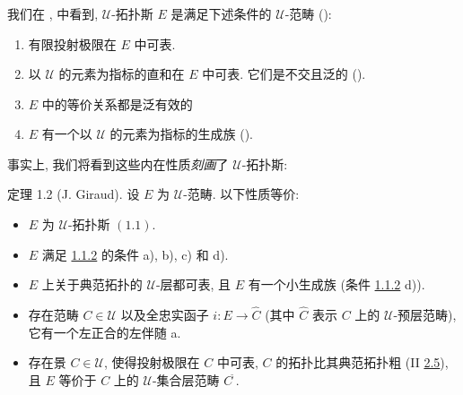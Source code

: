 \subsubsection{}
我们在 ,  中看到, $𝒰$-拓扑斯 $E$ 是满足下述条件的 $𝒰$-范畴 ():
\begin{enumerate}
\renewcommand{\theenumi}{\alph{enumi}}
\renewcommand{\labelenumi}{\theenumi)}
\item 有限投射极限在 $E$ 中可表.

\item 以 $𝒰$ 的元素为指标的直和在 $E$ 中可表. 它们是不交且泛的 ().

\item $E$ 中的等价关系都是泛有效的 

\item $E$ 有一个以 $𝒰$ 的元素为指标的生成族 ().
\end{enumerate}

事实上\pageoriginale, 我们将看到这些内在性质\emph{刻画}了 $𝒰$-拓扑斯:



\begin{enonce*}{定理 1.2}
{\rm (J. Giraud).} 设 $E$ 为 $𝒰$-范畴. 以下性质等价:
\begin{itemize}
\item[i)] $E$ 为 $𝒰$-拓扑斯 $(\hyperref[IV.def1.1]{1.1})$.

\item[ii)] $E$ 满足 {\rm \hyperref[IV.subsubsec1.1.2]{1.1.2} 的条件 a), b), c) 和 d).}

\item[iii)] $E$ 上关于典范拓扑的 $𝒰$-层都可表, 且 $E$ 有一个小生成族 (条件 {\rm \hyperref[IV.subsubsec1.1.2]{1.1.2} d)}).

\item[iv)] 存在范畴 $C\in 𝒰$ 以及全忠实函子 $i:E\rightarrow \widehat{C}$ (其中 $\widehat{C}$ 表示 $C$ 上的 $𝒰$-预层范畴), 它有一个左正合的左伴随 a.

\item[${\rm i')}$] 存在景 $C\in 𝒰$, 使得投射极限在 $C$ 中可表, $C$ 的拓扑比其典范拓扑粗 {\rm (II \hyperref[II.def2.5]{2.5}),} %
且 $E$ 等价于 $C$ 上的 $𝒰$-集合层范畴 $C^{\widetilde{\phantom{,}}}$.
\end{itemize}
\end{enonce*}

